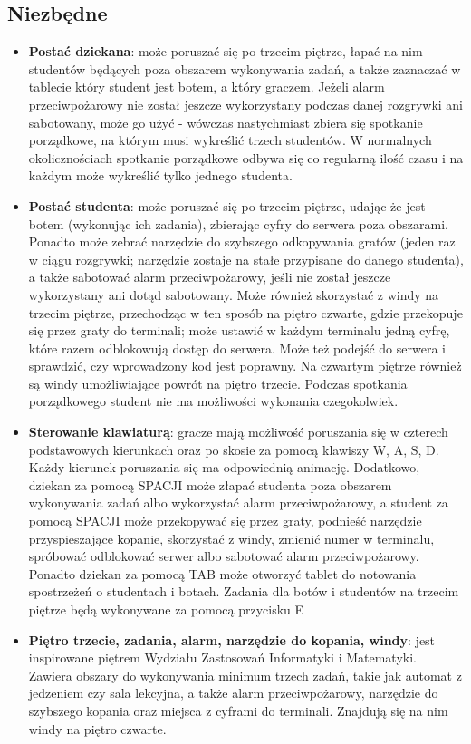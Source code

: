 \documentclass[]{report}
\begin{document}
\subsection{Niezbędne}
\begin{itemize}
	\item \textbf{Postać dziekana}: może poruszać się po trzecim piętrze, łapać na nim studentów będących poza obszarem wykonywania zadań, a także zaznaczać w tablecie który student jest botem, a który graczem. Jeżeli alarm przeciwpożarowy nie został jeszcze wykorzystany podczas danej rozgrywki ani sabotowany, może go użyć - wówczas nastychmiast zbiera się spotkanie porządkowe, na którym musi wykreślić trzech studentów. W normalnych okolicznościach spotkanie porządkowe odbywa się co regularną ilość czasu i na każdym może wykreślić tylko jednego studenta.
	\item \textbf{Postać studenta}: może poruszać się po trzecim piętrze, udając że jest botem (wykonując ich zadania), zbierając cyfry do serwera poza obszarami. Ponadto może zebrać narzędzie do szybszego odkopywania gratów (jeden raz w ciągu rozgrywki; narzędzie zostaje na stałe przypisane do danego studenta), a także sabotować alarm przeciwpożarowy, jeśli nie został jeszcze wykorzystany ani dotąd sabotowany. Może również skorzystać z windy na trzecim piętrze, przechodząc w ten sposób na piętro czwarte, gdzie przekopuje się przez graty do terminali; może ustawić w każdym terminalu jedną cyfrę, które razem odblokowują dostęp do serwera. Może też podejść do serwera i sprawdzić, czy wprowadzony kod jest poprawny. Na czwartym piętrze również są windy umożliwiające powrót na piętro trzecie. Podczas spotkania porządkowego student nie ma możliwości wykonania czegokolwiek.
	\item \textbf{Sterowanie klawiaturą}: gracze mają możliwość poruszania się w czterech podstawowych kierunkach oraz po skosie za pomocą klawiszy W, A, S, D. Każdy kierunek poruszania się ma odpowiednią animację. Dodatkowo, dziekan za pomocą SPACJI może złapać studenta poza obszarem wykonywania zadań albo wykorzystać alarm przeciwpożarowy, a student za pomocą SPACJI może przekopywać się przez graty, podnieść narzędzie przyspieszające kopanie, skorzystać z windy, zmienić numer w terminalu, spróbować odblokować serwer albo sabotować alarm przeciwpożarowy. Ponadto dziekan za pomocą TAB może otworzyć tablet do notowania spostrzeżeń o studentach i botach. Zadania dla botów i studentów na trzecim piętrze będą wykonywane za pomocą przycisku E
	\item \textbf{Piętro trzecie, zadania, alarm, narzędzie do kopania, windy}: jest inspirowane piętrem Wydziału Zastosowań Informatyki i Matematyki. Zawiera obszary do wykonywania minimum trzech zadań, takie jak automat z jedzeniem czy sala lekcyjna, a także alarm przeciwpożarowy, narzędzie do szybszego kopania oraz miejsca z cyframi do terminali. Znajdują się na nim windy na piętro czwarte.

\end{itemize}
\end{document}

